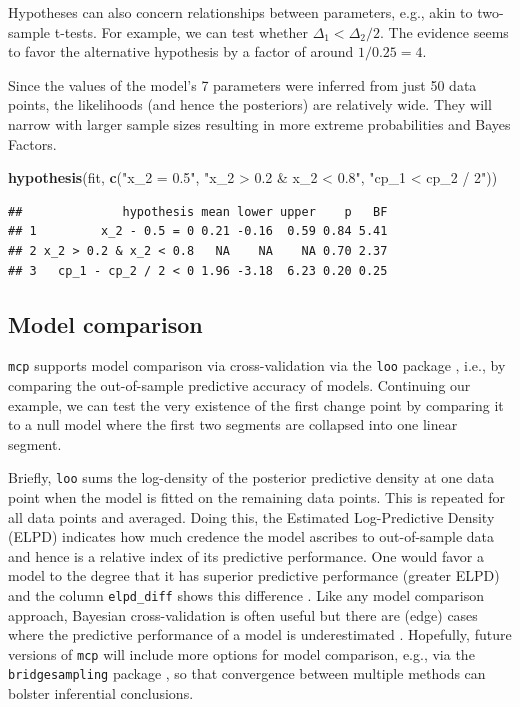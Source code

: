 \documentclass[
  american,
]{article}
\newenvironment{Shaded}{\begin{snugshade}}{\end{snugshade}}
\newcommand{\KeywordTok}[1]{\textcolor[rgb]{0.13,0.29,0.53}{\textbf{#1}}}
\newcommand{\NormalTok}[1]{#1}
\newcommand{\StringTok}[1]{\textcolor[rgb]{0.31,0.60,0.02}{#1}}
\begin{document}
Hypotheses can also concern relationships between parameters, e.g., akin to two-sample t-tests. For example, we can test whether \(\Delta_1 < \Delta_2 / 2\). The evidence seems to favor the alternative hypothesis by a factor of around \(1 / 0.25 = 4\).

Since the values of the model's 7 parameters were inferred from just 50 data points, the likelihoods (and hence the posteriors) are relatively wide. They will narrow with larger sample sizes resulting in more extreme probabilities and Bayes Factors.

\begin{Shaded}
\begin{Highlighting}[]
\KeywordTok{hypothesis}\NormalTok{(fit, }\KeywordTok{c}\NormalTok{(}\StringTok{"x_2 = 0.5"}\NormalTok{, }
                  \StringTok{"x_2 > 0.2 & x_2 < 0.8"}\NormalTok{,}
                  \StringTok{"cp_1 < cp_2 / 2"}\NormalTok{))}
\end{Highlighting}
\end{Shaded}

\begin{verbatim}
##              hypothesis mean lower upper    p   BF
## 1         x_2 - 0.5 = 0 0.21 -0.16  0.59 0.84 5.41
## 2 x_2 > 0.2 & x_2 < 0.8   NA    NA    NA 0.70 2.37
## 3   cp_1 - cp_2 / 2 < 0 1.96 -3.18  6.23 0.20 0.25
\end{verbatim}

\hypertarget{model-comparison}{%
\subsection{Model comparison}\label{model-comparison}}

\texttt{mcp} supports model comparison via cross-validation via the \texttt{loo} package \citep{vehtari2017}, i.e., by comparing the out-of-sample predictive accuracy of models. Continuing our example, we can test the very existence of the first change point by comparing it to a null model where the first two segments are collapsed into one linear segment.

Briefly, \texttt{loo} sums the log-density of the posterior predictive density at one data point when the model is fitted on the remaining data points. This is repeated for all data points and averaged. Doing this, the Estimated Log-Predictive Density (ELPD) indicates how much credence the model ascribes to out-of-sample data and hence is a relative index of its predictive performance. One would favor a model to the degree that it has superior predictive performance (greater ELPD) and the column \texttt{elpd\_diff} shows this difference \citep{vehtari2017, gelman2013b}. Like any model comparison approach, Bayesian cross-validation is often useful but there are (edge) cases where the predictive performance of a model is underestimated \citep{gronau2019a}. Hopefully, future versions of \texttt{mcp} will include more options for model comparison, e.g., via the \texttt{bridgesampling} package \citep{gronau2018}, so that convergence between multiple methods can bolster inferential conclusions.
\end{document}
